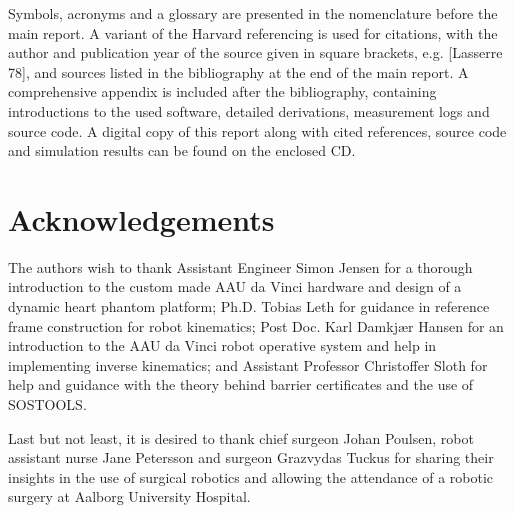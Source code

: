 Symbols, acronyms and a glossary are presented in the nomenclature before the main report.
A variant of the Harvard referencing is used for citations, with the author and publication year of the source given in square brackets, e.g. [Lasserre 78], and sources listed in the bibliography at the end of the main report. %
A comprehensive appendix is included after the bibliography, containing introductions to the used software, detailed derivations, measurement logs and source code.
A digital copy of this report along with cited references, source code and simulation results can be found on the enclosed CD.

\vspace*{-2mm}
\section*{Acknowledgements}
\vspace*{-2mm}
The authors wish to thank Assistant Engineer Simon Jensen for a thorough introduction to the custom made AAU da Vinci hardware and design of a dynamic heart phantom platform; Ph.D. Tobias Leth for guidance in reference frame construction for robot kinematics;  Post Doc. Karl Damkj\ae r Hansen for an introduction to the AAU da Vinci robot operative system and help in implementing inverse kinematics; and Assistant Professor Christoffer Sloth for help and guidance with the theory behind barrier certificates and the use of SOSTOOLS.

Last but not least, it is desired to thank chief surgeon Johan Poulsen, robot assistant nurse Jane Petersson and surgeon Grazvydas Tuckus for sharing their insights in the use of surgical robotics and allowing the attendance of a robotic surgery at Aalborg University Hospital.


